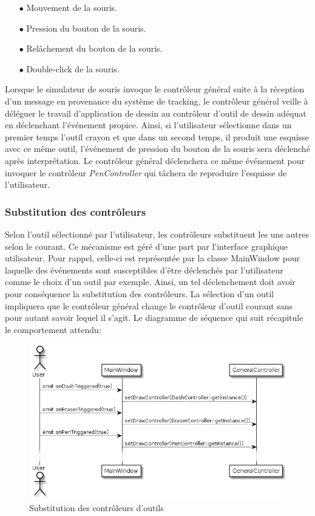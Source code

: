 \documentclass[11pt,a4paper,oldfontcommands]{memoir}
\begin{document}
\begin{itemize}
\item[$\bullet$] Mouvement de la souris.
\item[$\bullet$] Pression du bouton de la souris.
\item[$\bullet$] Relâchement du bouton de la souris.
\item[$\bullet$] Double-click de la souris.
\end{itemize}

Lorsque le simulateur de souris invoque le contrôleur général suite à la réception d'un message en provenance du système de tracking, le contrôleur général veille à déléguer le travail d'application de dessin au contrôleur d'outil de dessin adéquat en déclenchant l'événement propice. Ainsi, si l'utilisateur sélectionne dans un premier temps l'outil crayon et que dans un second temps, il produit une esquisse avec ce même outil, l'événement de pression du bouton de la souris sera déclenché après interprétation. Le contrôleur général déclenchera ce même événement pour invoquer le contrôleur \textit{PenController} qui tâchera de reproduire l'esquisse de l'utilisateur.

\subsubsection{Substitution des contrôleurs}

Selon l'outil sélectionné par l'utilisateur, les contrôleurs substituent les uns autres selon le courant. Ce mécanisme est géré d'une part par l'interface graphique utilisateur. Pour rappel, celle-ci est représentée par la classe MainWindow pour laquelle des événements sont susceptibles d'être déclenchés par l'utilisateur comme le choix d'un outil par exemple. Ainsi, un tel déclenchement doit avoir pour conséquence la substitution des contrôleurs. La sélection d'un outil impliquera que le contrôleur général change le contrôleur d'outil courant sans pour autant savoir lequel il s'agit. Le diagramme de séquence qui suit récapitule le comportement attendu:

\begin{figure}[h]
\centering
\includegraphics[scale=0.5]{images/tools-controllers-substitution.png}
\caption{Substitution des contrôleurs d'outils}
\end{figure}
\end{document}
